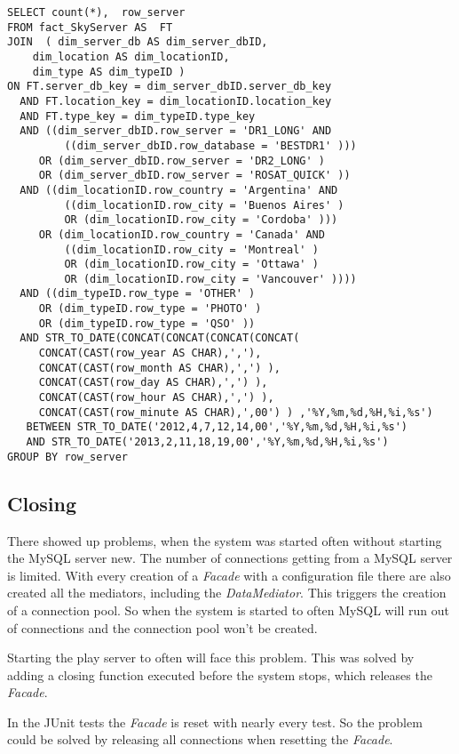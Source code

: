 \begin{lstlisting}
SELECT count(*),  row_server 
FROM fact_SkyServer AS  FT  
JOIN  ( dim_server_db AS dim_server_dbID,  
	dim_location AS dim_locationID,  
	dim_type AS dim_typeID )
ON FT.server_db_key = dim_server_dbID.server_db_key
  AND FT.location_key = dim_locationID.location_key
  AND FT.type_key = dim_typeID.type_key
  AND ((dim_server_dbID.row_server = 'DR1_LONG' AND
         ((dim_server_dbID.row_database = 'BESTDR1' ))) 
     OR (dim_server_dbID.row_server = 'DR2_LONG' )
     OR (dim_server_dbID.row_server = 'ROSAT_QUICK' ))
  AND ((dim_locationID.row_country = 'Argentina' AND
         ((dim_locationID.row_city = 'Buenos Aires' )
         OR (dim_locationID.row_city = 'Cordoba' )))   
     OR (dim_locationID.row_country = 'Canada' AND
         ((dim_locationID.row_city = 'Montreal' )
         OR (dim_locationID.row_city = 'Ottawa' )
         OR (dim_locationID.row_city = 'Vancouver' ))))  
  AND ((dim_typeID.row_type = 'OTHER' )  
     OR (dim_typeID.row_type = 'PHOTO' )  
     OR (dim_typeID.row_type = 'QSO' ))  
  AND STR_TO_DATE(CONCAT(CONCAT(CONCAT(CONCAT(
     CONCAT(CAST(row_year AS CHAR),','),
     CONCAT(CAST(row_month AS CHAR),',') ),
     CONCAT(CAST(row_day AS CHAR),',') ),
     CONCAT(CAST(row_hour AS CHAR),',') ),
     CONCAT(CAST(row_minute AS CHAR),',00') ) ,'%Y,%m,%d,%H,%i,%s')  
   BETWEEN STR_TO_DATE('2012,4,7,12,14,00','%Y,%m,%d,%H,%i,%s')  
   AND STR_TO_DATE('2013,2,11,18,19,00','%Y,%m,%d,%H,%i,%s')
GROUP BY row_server
\end{lstlisting}


\subsection{Closing}
There showed up problems, when the system was started often without starting the MySQL server new.
The number of connections getting from a MySQL server is limited. With every creation of a \textit{Facade}
with a configuration file there are also created all the mediators, including the \textit{DataMediator}.
This triggers the creation of a connection pool. So when the system is started to often
MySQL will run out of connections and the connection pool won't be created.

Starting the play server to often will face this problem. This was solved by adding a closing function
executed before the system stops, which releases the \textit{Facade}.

In the JUnit tests the \textit{Facade} is reset with nearly every test. So the problem could be
solved by releasing all connections when resetting the \textit{Facade}. 

